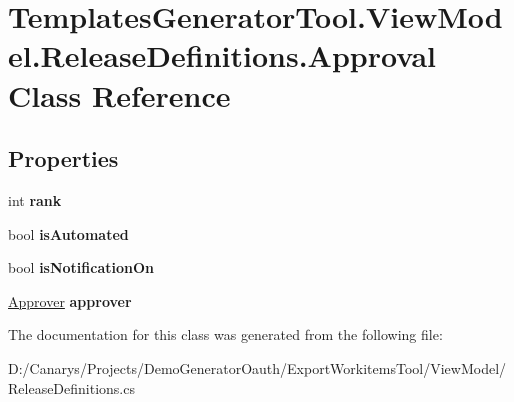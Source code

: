 \hypertarget{class_templates_generator_tool_1_1_view_model_1_1_release_definitions_1_1_approval}{}\section{Templates\+Generator\+Tool.\+View\+Model.\+Release\+Definitions.\+Approval Class Reference}
\label{class_templates_generator_tool_1_1_view_model_1_1_release_definitions_1_1_approval}
\subsection*{Properties}
\begin{DoxyCompactItemize}
\item 
\mbox{\label{class_templates_generator_tool_1_1_view_model_1_1_release_definitions_1_1_approval_ab761ee47c9052fc45b0089ff8041c2ac}} 
int {\bfseries rank}
\item 
\mbox{\label{class_templates_generator_tool_1_1_view_model_1_1_release_definitions_1_1_approval_a51c26d76e07568201756978d134e4de6}} 
bool {\bfseries is\+Automated}
\item 
\mbox{\label{class_templates_generator_tool_1_1_view_model_1_1_release_definitions_1_1_approval_ac8273c40823ff0b3871aa5b80875a8f4}} 
bool {\bfseries is\+Notification\+On}
\item 
\mbox{\label{class_templates_generator_tool_1_1_view_model_1_1_release_definitions_1_1_approval_a4151d86b88351995d1a7fb08166e25c8}} 
\mbox{\hyperlink{class_templates_generator_tool_1_1_view_model_1_1_release_definitions_1_1_approver}{Approver}} {\bfseries approver}
\end{DoxyCompactItemize}


The documentation for this class was generated from the following file\+:\begin{DoxyCompactItemize}
\item 
D\+:/\+Canarys/\+Projects/\+Demo\+Generator\+Oauth/\+Export\+Workitems\+Tool/\+View\+Model/Release\+Definitions.\+cs\end{DoxyCompactItemize}
